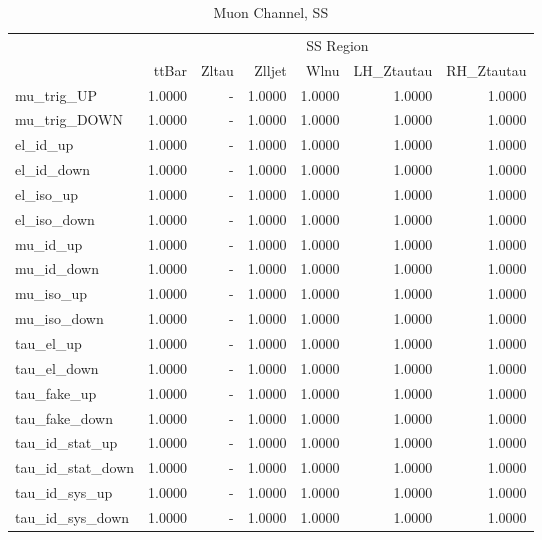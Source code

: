 \documentclass[11pt,oneside,a4paper]{article}
\begin{document}
\begin{table}
\begin{tabular}{lrrrrrr}
 & \multicolumn{6}{c}{SS Region} \\

 & ttBar & Zltau & Zlljet & Wlnu & LH\_Ztautau & RH\_Ztautau \\
 mu\_trig\_UP & 1.0000 & - & 1.0000 & 1.0000 & 1.0000 & 1.0000 \\
mu\_trig\_DOWN & 1.0000 & - & 1.0000 & 1.0000 & 1.0000 & 1.0000 \\
el\_id\_up & 1.0000 & - & 1.0000 & 1.0000 & 1.0000 & 1.0000 \\
el\_id\_down & 1.0000 & - & 1.0000 & 1.0000 & 1.0000 & 1.0000 \\
el\_iso\_up & 1.0000 & - & 1.0000 & 1.0000 & 1.0000 & 1.0000 \\
el\_iso\_down & 1.0000 & - & 1.0000 & 1.0000 & 1.0000 & 1.0000 \\
mu\_id\_up & 1.0000 & - & 1.0000 & 1.0000 & 1.0000 & 1.0000 \\
mu\_id\_down & 1.0000 & - & 1.0000 & 1.0000 & 1.0000 & 1.0000 \\
mu\_iso\_up & 1.0000 & - & 1.0000 & 1.0000 & 1.0000 & 1.0000 \\
mu\_iso\_down & 1.0000 & - & 1.0000 & 1.0000 & 1.0000 & 1.0000 \\
tau\_el\_up & 1.0000 & - & 1.0000 & 1.0000 & 1.0000 & 1.0000 \\
tau\_el\_down & 1.0000 & - & 1.0000 & 1.0000 & 1.0000 & 1.0000 \\
tau\_fake\_up & 1.0000 & - & 1.0000 & 1.0000 & 1.0000 & 1.0000 \\
tau\_fake\_down & 1.0000 & - & 1.0000 & 1.0000 & 1.0000 & 1.0000 \\
tau\_id\_stat\_up & 1.0000 & - & 1.0000 & 1.0000 & 1.0000 & 1.0000 \\
tau\_id\_stat\_down & 1.0000 & - & 1.0000 & 1.0000 & 1.0000 & 1.0000 \\
tau\_id\_sys\_up & 1.0000 & - & 1.0000 & 1.0000 & 1.0000 & 1.0000 \\
tau\_id\_sys\_down & 1.0000 & - & 1.0000 & 1.0000 & 1.0000 & 1.0000 \\
\end{tabular}
\caption{Muon Channel, SS}
\end{table}
\end{document}
